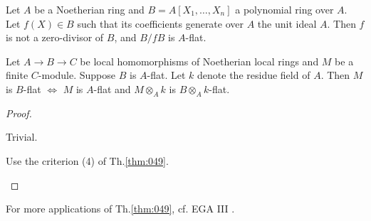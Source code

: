 \documentclass[../main]{subfiles}
\begin{document}
\begin{corollary} Let $A$ be a Noetherian ring and $B = A[X_1,\dots,X_n]$ a polynomial ring over $A$. Let $f(X)\in B$ such that its coefficients generate over $A$ the unit ideal $A$. Then $f$ is not a zero-divisor of $B$, and $B/fB$ is $A$-flat.\end{corollary}

\begin{parapplication} Let $A\longrightarrow B \longrightarrow C$ be local homomorphisms of Noetherian local rings and $M$ be a finite $C$-module. Suppose $B$ is $A$-flat. Let $k$ denote the residue field of $A$. Then $M$ is $B$-flat $\iff$ $M$ is $A$-flat and $M\otimes_A k$ is $B\otimes_A k$-flat. \end{parapplication}

\begin{proof}\phantom{,}
\begin{implyenumerate}
    \item[$\implies$] Trivial.
    \item[$\impliedby$] Use the criterion (4) of Th.\ref{thm:049}.
\end{implyenumerate}
\end{proof}

For more applications of Th.\ref{thm:049}, cf. EGA III \cite{egaIII1}.
\end{document}

